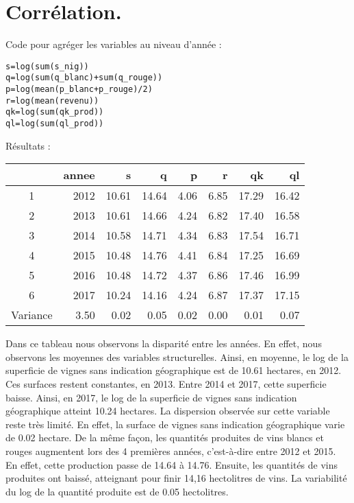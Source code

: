 \documentclass[11pt, a4paper]{article}
\begin{document}
\section*{Corrélation.}
\par
Code pour agréger les variables au niveau d'année :
\begin{alltt}
      s = log(sum(s_nig)) 
      q = log(sum(q_blanc) + sum(q_rouge)) 
      p = log(mean(p_blanc + p_rouge)/2)
      r = log(mean(revenu))
      qk = log(sum(qk_prod))
      ql = log(sum(ql_prod))
\end{alltt}
Résultats :
\FloatBarrier
\begin{center}
\begin{tabular}{c|rrrrrrr}
  \hline
 & annee & s & q & p & r & qk & ql \\ 
  \hline
  1 & 2012 & 10.61 & 14.64 & 4.06 & 6.85 & 17.29 & 16.42 \\ 
  2 & 2013 & 10.61 & 14.66 & 4.24 & 6.82 & 17.40 & 16.58 \\ 
  3 & 2014 & 10.58 & 14.71 & 4.34 & 6.83 & 17.54 & 16.71 \\ 
  4 & 2015 & 10.48 & 14.76 & 4.41 & 6.84 & 17.25 & 16.69 \\ 
  5 & 2016 & 10.48 & 14.72 & 4.37 & 6.86 & 17.46 & 16.99 \\ 
  6 & 2017 & 10.24 & 14.16 & 4.24 & 6.87 & 17.37 & 17.15 \\ 
   \hline
  Variance & 3.50 & 0.02 & 0.05 & 0.02 & 0.00 & 0.01 & 0.07 \\ 
   \hline
\end{tabular}
\end{center}
\FloatBarrier
Dans ce tableau nous observons la disparité entre les années. 
En effet, nous observons les moyennes des variables structurelles. 
Ainsi, en moyenne, le log de la superficie de vignes sans indication géographique est de 10.61 hectares, en 2012. 
Ces surfaces restent constantes, en 2013. 
Entre 2014 et 2017, cette superficie baisse. 
Ainsi, en 2017, le log de la superficie de vignes sans indication géographique atteint 10.24 hectares. 
La dispersion observée sur cette variable reste très limité. 
En effet,  la surface de vignes sans indication géographique varie de 0.02 hectare. 
De la même façon, les quantités produites de vins blancs et rouges augmentent lors des 4 premières années, c’est-à-dire entre 2012 et 2015. 
En effet, cette production passe de 14.64 à 14.76. 
Ensuite, les quantités de vins produites ont baissé, atteignant pour finir 14,16 hectolitres de vins. 
La variabilité du log de la quantité produite est de 0.05 hectolitres. 
\end{document}
